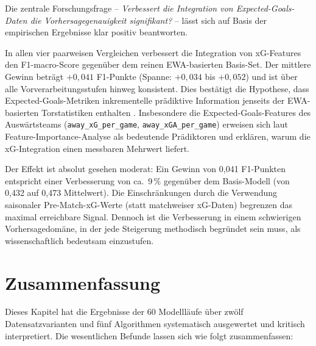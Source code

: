 Die zentrale Forschungsfrage -- \emph{Verbessert die Integration von
Expected-Goals-Daten die Vorhersagegenauigkeit signifikant?} -- lässt
sich auf Basis der empirischen Ergebnisse klar positiv beantworten.

In allen vier paarweisen Vergleichen verbessert die Integration von
xG-Features den F1-macro-Score gegenüber dem reinen EWA-basierten Basis-Set.
Der mittlere Gewinn beträgt $+0{,}041$ F1-Punkte (Spanne: $+0{,}034$
bis $+0{,}052$) und ist über alle Vorverarbeitungsstufen hinweg konsistent.
Dies bestätigt die Hypothese, dass Expected-Goals-Metriken inkrementelle
prädiktive Information jenseits der EWA-basierten Torstatistiken enthalten
\cite{AnzerBauer2021,VanEetveldeEtAl2024}. Insbesondere die Expected-Goals-Features
des Auswärtsteams (\texttt{away\_xG\_per\_game}, \texttt{away\_xGA\_per\_game})
erweisen sich laut Feature-Importance-Analyse als bedeutende Prädiktoren
und erklären, warum die xG-Integration einen messbaren Mehrwert liefert.

Der Effekt ist absolut gesehen moderat: Ein Gewinn von 0,041 F1-Punkten
entspricht einer Verbesserung von ca.\ 9\,\% gegenüber dem Basis-Modell
(von 0,432 auf 0,473 Mittelwert). Die Einschränkungen durch die Verwendung
saisonaler Pre-Match-xG-Werte (statt matchweiser xG-Daten) begrenzen
das maximal erreichbare Signal. Dennoch ist die Verbesserung in einem
schwierigen Vorhersagedomäne, in der jede Steigerung methodisch begründet
sein muss, als wissenschaftlich bedeutsam einzustufen.

\section{Zusammenfassung}
\label{sec:eval-zusammenfassung}

Dieses Kapitel hat die Ergebnisse der 60 Modellläufe über zwölf
Datensatzvarianten und fünf Algorithmen systematisch ausgewertet und
kritisch interpretiert. Die wesentlichen Befunde lassen sich wie folgt
zusammenfassen:

